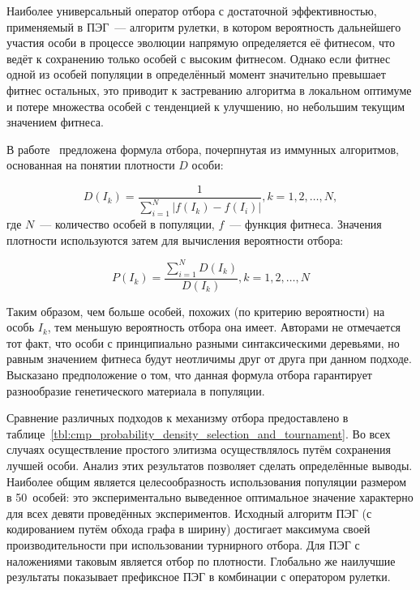 Наиболее универсальный оператор отбора с достаточной эффективностью, применяемый в ПЭГ~--- алгоритм рулетки, в котором вероятность дальнейшего участия особи в процессе эволюции напрямую определяется её фитнесом, что ведёт к сохранению только особей с высоким фитнесом. Однако если фитнес одной из особей популяции в определённый момент значительно превышает фитнес остальных, это приводит к застреванию алгоритма в локальном оптимуме и потере множества особей с тенденцией к улучшению, но небольшим текущим значением фитнеса.

В работе~\cite{conf/icnc/PengTZY05} предложена формула отбора, почерпнутая из иммунных алгоритмов, основанная на понятии плотности $D$ особи:

\begin{equation}
\label{eq:EAOGE_density}
D(I_k) = \frac{1}{\sum\limits_{i=1}^N{|f(I_k) - f(I_i)|}}, k=1,2,\ldots,N,
\end{equation}
где $N$~--- количество особей в популяции, $f$~--- функция фитнеса. Значения плотности используются затем для вычисления вероятности отбора:

\begin{equation}
\label{eq:EAOGE_probability}
P(I_k) = \frac{\sum\limits_{i=1}^N{D(I_k)}}{D(I_k)}, k=1,2,\ldots,N
\end{equation}

Таким образом, чем больше особей, похожих (по критерию вероятности) на особь $I_k$, тем меньшую вероятность отбора она имеет. Авторами не отмечается тот факт, что особи с принципиально разными синтаксическими деревьями, но равным значением фитнеса будут неотличимы друг от друга при данном подходе. Высказано предположение о том, что данная формула отбора гарантирует разнообразие генетического материала в популяции.

Сравнение различных подходов к механизму отбора предоставлено в таблице~\ref{tbl:cmp_probability_density_selection_and_tournament}. Во всех случаях осуществление простого элитизма осуществлялось путём сохранения лучшей особи. Анализ этих результатов позволяет сделать определённые выводы. Наиболее общим является целесообразность использования популяции размером в 50~особей: это экспериментально выведенное оптимальное значение характерно для всех девяти проведённых экспериментов. Исходный алгоритм ПЭГ (с кодированием путём обхода графа в ширину) достигает максимума своей производительности при использовании турнирного отбора. Для ПЭГ с наложениями таковым является отбор по плотности. Глобально же наилучшие результаты показывает префиксное ПЭГ в комбинации с оператором рулетки.

